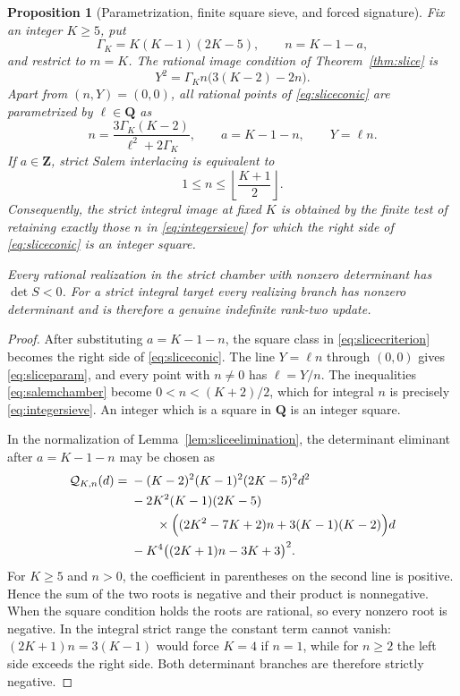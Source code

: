 \documentclass[11pt,reqno]{amsart}
\newtheorem{proposition}[theorem]{Proposition}
\theoremstyle{definition}
\theoremstyle{remark}
\newcommand{\Q}{\mathbf Q}
\newcommand{\Z}{\mathbf Z}
\begin{document}
\begin{proposition}[Parametrization, finite square sieve, and forced signature]
\label{prop:sliceparam}
Fix an integer $K\geq5$, put
\[
 \Gamma_K=K(K-1)(2K-5),\qquad n=K-1-a,
\]
and restrict to $m=K$.  The rational image condition of
Theorem~\ref{thm:slice} is
\begin{equation}\label{eq:sliceconic}
 Y^2=\Gamma_K n\bigl(3(K-2)-2n\bigr).
\end{equation}
Apart from $(n,Y)=(0,0)$, all rational points of
\eqref{eq:sliceconic} are parametrized by $\ell\in\Q$ as
\begin{equation}\label{eq:sliceparam}
 n=\frac{3\Gamma_K(K-2)}{\ell^2+2\Gamma_K},\qquad
 a=K-1-n,\qquad Y=\ell n.
\end{equation}
If $a\in\Z$, strict Salem interlacing is equivalent to
\begin{equation}\label{eq:integersieve}
 1\leq n\leq\left\lfloor\frac{K+1}{2}\right\rfloor.
\end{equation}
Consequently, the strict integral image at fixed $K$ is obtained by the
finite test of retaining exactly those $n$ in \eqref{eq:integersieve} for
which the right side of \eqref{eq:sliceconic} is an integer square.

Every rational realization in the strict chamber with nonzero determinant
has $\det S<0$.  For a strict integral target every realizing branch has
nonzero determinant and is therefore a genuine indefinite rank-two update.
\end{proposition}

\begin{proof}
After substituting $a=K-1-n$, the square class in
\eqref{eq:slicecriterion} becomes the right side of
\eqref{eq:sliceconic}.  The line $Y=\ell n$ through $(0,0)$ gives
\eqref{eq:sliceparam}, and every point with $n\ne0$ has $\ell=Y/n$.
The inequalities \eqref{eq:salemchamber} become
$0<n<(K+2)/2$, which for integral $n$ is precisely
\eqref{eq:integersieve}.  An integer which is a square in $\Q$ is an
integer square.

In the normalization of Lemma~\ref{lem:sliceelimination}, the determinant
eliminant after $a=K-1-n$ may be chosen as
\begin{align}\label{eq:deteliminantn}
 \mathcal Q_{K,n}(d)={}&
 -(K-2)^2(K-1)^2(2K-5)^2d^2\\
 &-2K^2(K-1)(2K-5)\notag\\
 &\qquad{}\times
 \Bigl((2K^2-7K+2)n+3(K-1)(K-2)\Bigr)d\notag\\
 &-K^4\bigl((2K+1)n-3K+3\bigr)^2.\notag
\end{align}
For $K\geq5$ and $n>0$, the coefficient in parentheses on the second
line is positive.  Hence the sum of the two roots is negative and their
product is nonnegative.  When the square condition holds the roots are
rational, so every nonzero root is negative.  In the integral strict range
the constant term cannot vanish: $(2K+1)n=3(K-1)$ would force $K=4$ if
$n=1$, while for $n\geq2$ the left side exceeds the right side.  Both
determinant branches are therefore strictly negative.
\end{proof}
\end{document}
